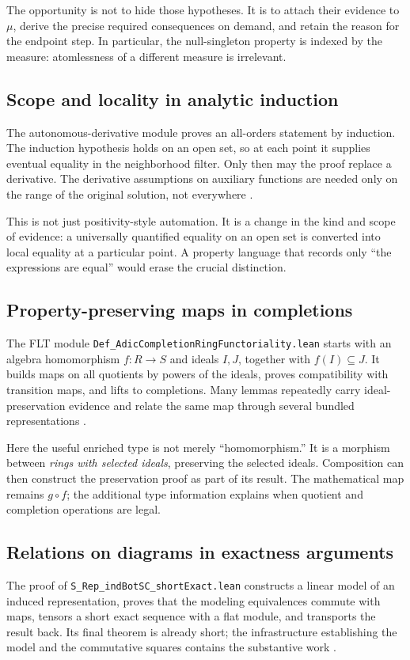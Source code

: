 \documentclass[11pt,a4paper]{article}
\newcommand{\code}[1]{\nolinkurl{#1}}
\theoremstyle{plain}
\theoremstyle{definition}
\theoremstyle{remark}
\begin{document}
The opportunity is not to hide those hypotheses. It is to attach their evidence
to $\mu$, derive the precise required consequences on demand, and retain the
reason for the endpoint step. In particular, the null-singleton property is
indexed by the measure: atomlessness of a different measure is irrelevant.

\subsection{Scope and locality in analytic induction}
The autonomous-derivative module proves an all-orders statement by induction.
The induction hypothesis holds on an open set, so at each point it supplies
eventual equality in the neighborhood filter. Only then may the proof replace
a derivative. The derivative assumptions on auxiliary functions are needed
only on the range of the original solution, not everywhere
\cite{odesource}.

This is not just positivity-style automation. It is a change in the kind and
scope of evidence: a universally quantified equality on an open set is
converted into local equality at a particular point. A property language that
records only ``the expressions are equal'' would erase the crucial distinction.

\subsection{Property-preserving maps in completions}
The FLT module \code{Def_AdicCompletionRingFunctoriality.lean} starts with an
algebra homomorphism $f:R\to S$ and ideals $I,J$, together with
$f(I)\subseteq J$. It builds maps on all quotients by powers of the ideals,
proves compatibility with transition maps, and lifts to completions. Many
lemmas repeatedly carry ideal-preservation evidence and relate the same map
through several bundled representations \cite{completionsource}.

Here the useful enriched type is not merely ``homomorphism.'' It is a morphism
between \emph{rings with selected ideals}, preserving the selected ideals.
Composition can then construct the preservation proof as part of its result.
The mathematical map remains $g\circ f$; the additional type information
explains when quotient and completion operations are legal.

\subsection{Relations on diagrams in exactness arguments}
The proof of \code{S_Rep_indBotSC_shortExact.lean} constructs a linear model of
an induced representation, proves that the modeling equivalences commute with
maps, tensors a short exact sequence with a flat module, and transports the
result back. Its final theorem is already short; the infrastructure establishing
the model and the commutative squares contains the substantive work
\cite{exactsource}.
\end{document}
